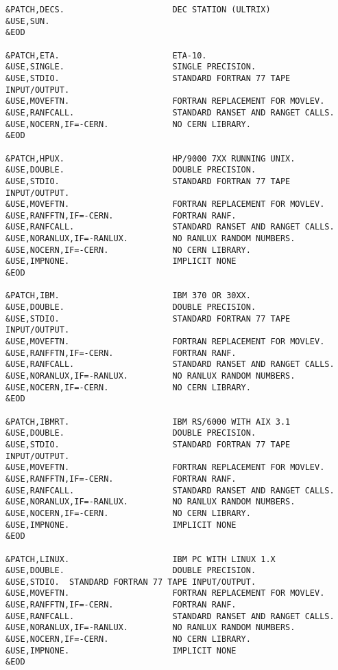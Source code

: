 \begin{verbatim}
&PATCH,DECS.                      DEC STATION (ULTRIX)
&USE,SUN.
&EOD

&PATCH,ETA.                       ETA-10.
&USE,SINGLE.                      SINGLE PRECISION.
&USE,STDIO.                       STANDARD FORTRAN 77 TAPE INPUT/OUTPUT.
&USE,MOVEFTN.                     FORTRAN REPLACEMENT FOR MOVLEV.
&USE,RANFCALL.                    STANDARD RANSET AND RANGET CALLS.
&USE,NOCERN,IF=-CERN.             NO CERN LIBRARY.
&EOD

&PATCH,HPUX.                      HP/9000 7XX RUNNING UNIX.
&USE,DOUBLE.                      DOUBLE PRECISION.
&USE,STDIO.                       STANDARD FORTRAN 77 TAPE INPUT/OUTPUT.
&USE,MOVEFTN.                     FORTRAN REPLACEMENT FOR MOVLEV.
&USE,RANFFTN,IF=-CERN.            FORTRAN RANF.
&USE,RANFCALL.                    STANDARD RANSET AND RANGET CALLS.
&USE,NORANLUX,IF=-RANLUX.         NO RANLUX RANDOM NUMBERS.
&USE,NOCERN,IF=-CERN.             NO CERN LIBRARY.
&USE,IMPNONE.                     IMPLICIT NONE
&EOD

&PATCH,IBM.                       IBM 370 OR 30XX.
&USE,DOUBLE.                      DOUBLE PRECISION.
&USE,STDIO.                       STANDARD FORTRAN 77 TAPE INPUT/OUTPUT.
&USE,MOVEFTN.                     FORTRAN REPLACEMENT FOR MOVLEV.
&USE,RANFFTN,IF=-CERN.            FORTRAN RANF.
&USE,RANFCALL.                    STANDARD RANSET AND RANGET CALLS.
&USE,NORANLUX,IF=-RANLUX.         NO RANLUX RANDOM NUMBERS.
&USE,NOCERN,IF=-CERN.             NO CERN LIBRARY.
&EOD

&PATCH,IBMRT.                     IBM RS/6000 WITH AIX 3.1
&USE,DOUBLE.                      DOUBLE PRECISION.
&USE,STDIO.                       STANDARD FORTRAN 77 TAPE INPUT/OUTPUT.
&USE,MOVEFTN.                     FORTRAN REPLACEMENT FOR MOVLEV.
&USE,RANFFTN,IF=-CERN.            FORTRAN RANF.
&USE,RANFCALL.                    STANDARD RANSET AND RANGET CALLS.
&USE,NORANLUX,IF=-RANLUX.         NO RANLUX RANDOM NUMBERS.
&USE,NOCERN,IF=-CERN.             NO CERN LIBRARY.
&USE,IMPNONE.                     IMPLICIT NONE
&EOD

&PATCH,LINUX.                     IBM PC WITH LINUX 1.X
&USE,DOUBLE.                      DOUBLE PRECISION.
&USE,STDIO.  STANDARD FORTRAN 77 TAPE INPUT/OUTPUT.
&USE,MOVEFTN.                     FORTRAN REPLACEMENT FOR MOVLEV.
&USE,RANFFTN,IF=-CERN.            FORTRAN RANF.
&USE,RANFCALL.                    STANDARD RANSET AND RANGET CALLS.
&USE,NORANLUX,IF=-RANLUX.         NO RANLUX RANDOM NUMBERS.
&USE,NOCERN,IF=-CERN.             NO CERN LIBRARY.
&USE,IMPNONE.                     IMPLICIT NONE
&EOD


\end{verbatim}
